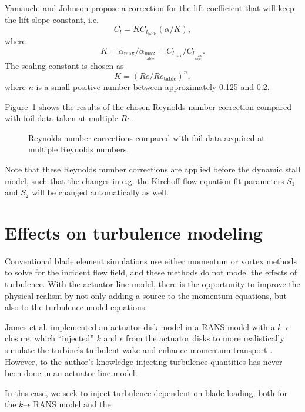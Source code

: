 Yamauchi and Johnson propose a correction for the lift coefficient that will keep the lift slope constant, i.e.
\begin{equation}
C_l = K C_{l_\mathrm{table}} (\alpha/K),
\end{equation}
where
\begin{equation}
K = \alpha_{\max} / \alpha_{\max_\mathrm{table}} = C_{l_{\max}} /
C_{l_{\max_\mathrm{table}}}.
\end{equation}
The scaling constant is chosen as
\begin{equation}
K = \left( Re/Re_\mathrm{table} \right)^n,
\end{equation}
where $n$ is a small positive number between approximately 0.125 and 0.2.

Figure~\ref{fig:Re-corrections} shows the results of the chosen Reynolds number
correction compared with foil data taken at multiple $Re$.

\begin{figure}
\caption{Reynolds number corrections compared with foil data acquired at
multiple Reynolds numbers.}
\label{fig:Re-corrections}
\end{figure}

Note that these Reynolds number corrections are applied before the dynamic stall
model, such that the changes in e.g. the Kirchoff flow equation fit parameters
$S_1$ and $S_2$ will be changed automatically as well.


\section{Effects on turbulence modeling}

Conventional blade element simulations use either momentum or vortex methods to
solve for the incident flow field, and these methods do not model the effects of
turbulence. With the actuator line model, there is the opportunity to improve
the physical realism by not only adding a source to the momentum equations, but
also to the turbulence model equations.

James et al. implemented an actuator disk model in a RANS model with a
$k$--$\epsilon$ closure, which ``injected'' $k$ and $\epsilon$ from the actuator
disks to more realistically simulate the turbine's turbulent wake and enhance
momentum transport \cite{James2010}. However, to the author's knowledge
injecting turbulence quantities has never been done in an actuator line model.

In this case, we seek to inject turbulence dependent on blade loading, both
for the $k$--$\epsilon$ RANS model and the



